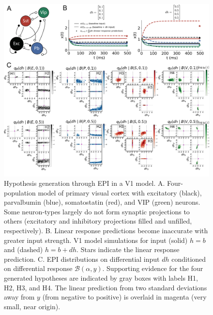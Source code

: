 \documentclass[11pt]{article}
\begin{document}
\begin{figure}
\begin{center}
\includegraphics[scale=0.52]{figures/fig2/fig2.pdf}
\end{center}
\caption{Hypothesis generation through EPI in a V1 model.  A. Four-population model of primary visual cortex with excitatory (black), parvalbumin (blue), somatostatin (red), and VIP (green) neurons.   Some neuron-types largely do not form synaptic projections to others  (excitatory and inhibitory projections filled and unfilled, respectively).  B. Linear response predictions become inaccurate with greater input strength.  V1 model simulations for input (solid) $h=b$ and (dashed) $h = b + dh$. Stars indicate the linear response prediction.  C. EPI distributions on differential input $dh$ conditioned on differential response $\mathcal{B}(\alpha, y)$. Supporting evidence for the four generated hypotheses are indicated by gray boxes with labels H1, H2, H3, and H4. The linear prediction from two standard deviations away from $y$ (from negative to positive) is overlaid in magenta (very small, near origin). }
 \label{fig:V1_EPI}
\end{figure}
\end{document}

